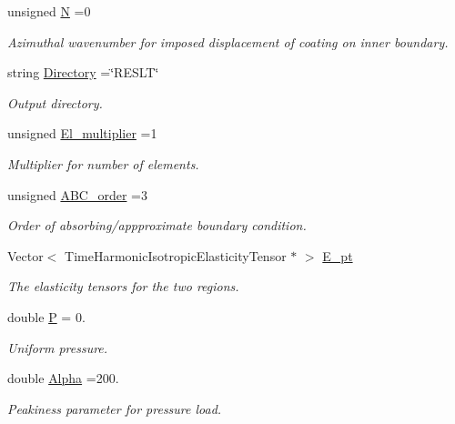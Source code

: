 \begin{DoxyCompactItemize}
unsigned \hyperlink{namespaceGlobal__Parameters_aff31353c09f439f3d537ad06ce868787}{N} =0
\begin{DoxyCompactList}\small\item\em Azimuthal wavenumber for imposed displacement of coating on inner boundary. \end{DoxyCompactList}\item 
string \hyperlink{namespaceGlobal__Parameters_a301ab922df72030c660b21328d6caf76}{Directory} =\char`\"{}R\+E\+S\+LT\char`\"{}
\begin{DoxyCompactList}\small\item\em Output directory. \end{DoxyCompactList}\item 
unsigned \hyperlink{namespaceGlobal__Parameters_a35d5d2ecfff0cec6150a5dc79e5c1ad1}{El\+\_\+multiplier} =1
\begin{DoxyCompactList}\small\item\em Multiplier for number of elements. \end{DoxyCompactList}\item 
unsigned \hyperlink{namespaceGlobal__Parameters_ae16eb10039cab2098b02ec7dff946277}{A\+B\+C\+\_\+order} =3
\begin{DoxyCompactList}\small\item\em Order of absorbing/appproximate boundary condition. \end{DoxyCompactList}\item 
Vector$<$ Time\+Harmonic\+Isotropic\+Elasticity\+Tensor $\ast$ $>$ \hyperlink{namespaceGlobal__Parameters_a73c731fa617a9d92851e4195493262e7}{E\+\_\+pt}
\begin{DoxyCompactList}\small\item\em The elasticity tensors for the two regions. \end{DoxyCompactList}\item 
double \hyperlink{namespaceGlobal__Parameters_a31fb55c20db4aa0127aafa20f0d76731}{P} = 0.
\begin{DoxyCompactList}\small\item\em Uniform pressure. \end{DoxyCompactList}\item 
double \hyperlink{namespaceGlobal__Parameters_afbe27ad463a1fb23cb99d029a9fac731}{Alpha} =200.
\begin{DoxyCompactList}\small\item\em Peakiness parameter for pressure load. \end{DoxyCompactList}\end{DoxyCompactItemize}


